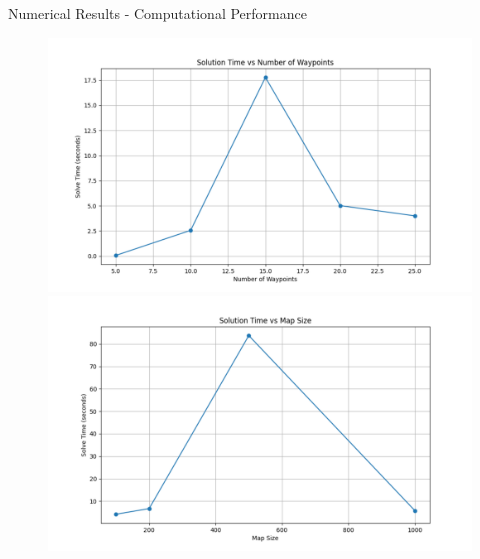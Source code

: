 \documentclass[aspectratio=169,11pt,xcolor={dvipsnames},hyperref={pdftex,pdfpagemode=UseNone,hidelinks,pdfdisplaydoctitle=true},usepdftitle=false]{beamer}
\begin{document}
\begin{frame}{Numerical Results - Computational Performance}
      \begin{figure}
        \centering
        \includegraphics[scale=0.19]{figures/waypoints_vs_time.pdf}
        \includegraphics[scale=0.19]{figures/map_size_vs_time.pdf}
      \end{figure}
    \end{frame}
\end{document}
